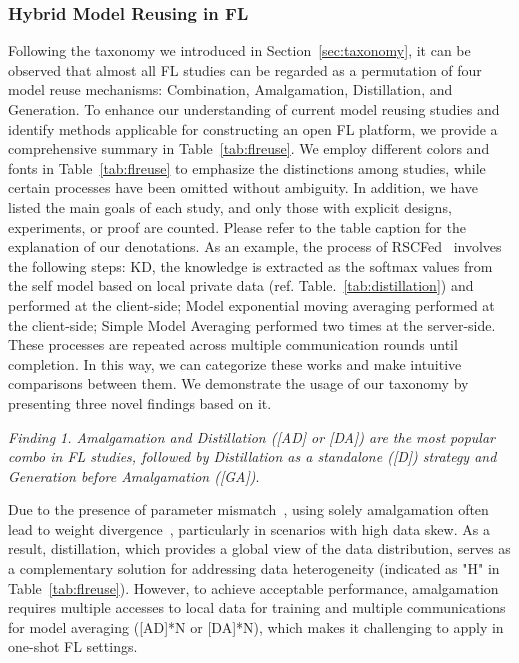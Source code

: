 \subsubsection{Hybrid Model Reusing in FL}
\label{sec:hybrid}
Following the taxonomy we introduced in Section~\ref{sec:taxonomy}, it can be observed that almost all FL studies can be regarded as a permutation of four model reuse mechanisms: Combination, Amalgamation, Distillation, and Generation.
To enhance our understanding of current model reusing studies and identify methods applicable for constructing an open FL platform, we provide a comprehensive summary in Table~\ref{tab:flreuse}. 
We employ different colors and fonts in Table~\ref{tab:flreuse} to emphasize the distinctions among studies, while certain processes have been omitted without ambiguity.
In addition, we have listed the main goals of each study, and only those with explicit designs, experiments, or proof are counted.
Please refer to the table caption for the explanation of our denotations.
As an example, the process of RSCFed~\cite{liang2022rscfed} involves the following steps: 
 KD, the knowledge is extracted as the softmax values from the self model based on local private data (ref. Table.~\ref{tab:distillation}) and performed at the client-side;
 Model exponential moving averaging performed at the client-side;
 Simple Model Averaging performed two times at the server-side.
These processes are repeated across multiple communication rounds until completion.
In this way, we can categorize these works and make intuitive comparisons between them.
We demonstrate the usage of our taxonomy by presenting three novel findings based on it.

\textit{Finding 1. Amalgamation and Distillation ([AD] or [DA]) are the most popular combo in FL studies, followed by Distillation as a standalone ([D]) strategy and Generation before Amalgamation ([GA])}.

Due to the presence of parameter mismatch~\cite{yu2021fed2, wang2020federated, yurochkin2019statistical}, using solely amalgamation often lead to weight divergence~\cite{Li2020On, tan2022towards}, particularly in scenarios with high data skew. 
As a result, distillation, which provides a global view of the data distribution, serves as a complementary solution for addressing data heterogeneity (indicated as "H" in Table~\ref{tab:flreuse}).
However, to achieve acceptable performance, amalgamation requires multiple accesses to local data for training and multiple communications for model averaging ([AD]*N or [DA]*N), which makes it challenging to apply in one-shot FL settings.

